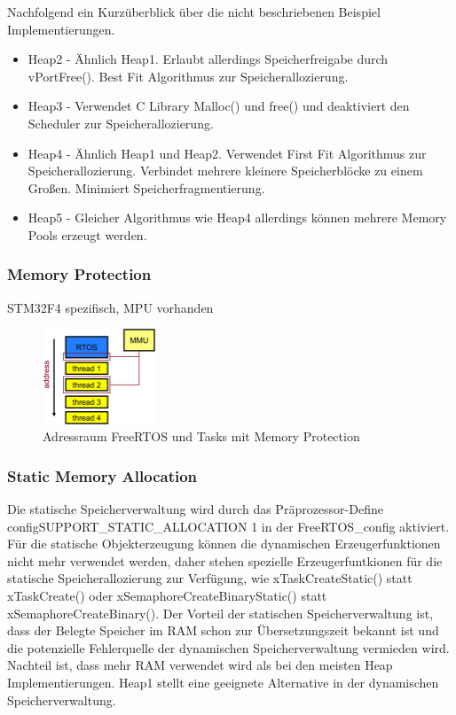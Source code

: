 Nachfolgend ein Kurzüberblick über die nicht beschriebenen Beispiel Implementierungen.  
\begin{itemize}
	\item Heap2 - Ähnlich Heap1. Erlaubt allerdings Speicherfreigabe durch vPortFree(). Best Fit Algorithmus zur Speicherallozierung. 
	\item Heap3 - Verwendet C Library Malloc() und free() und deaktiviert den Scheduler zur Speicherallozierung.
	\item Heap4 - Ähnlich Heap1 und Heap2. Verwendet First Fit Algorithmus zur Speicherallozierung. Verbindet mehrere kleinere Speicherblöcke zu einem Großen. Minimiert Speicherfragmentierung.
	\item Heap5 - Gleicher Algorithmus wie Heap4 allerdings können mehrere Memory Pools erzeugt werden.
\end{itemize}
\subsubsection{Memory Protection}
\label{sec:Memory Protection}
STM32F4 spezifisch, MPU vorhanden
\begin{figure}[hb!]
	\centering
		\includegraphics[width=0.3\textwidth]{Pictures/EmbeddedCom/addressSpaceMMU}
	\caption{Adressraum FreeRTOS und Tasks mit Memory Protection}
	\label{fig:AddressSpaceMMU}
\end{figure} 
\subsubsection{Static Memory Allocation}
Die statische Speicherverwaltung wird durch das Präprozessor-Define configSUPPORT\_STATIC\_ALLOCATION 1 in der FreeRTOS\_config aktiviert. Für die statische Objekterzeugung können die dynamischen Erzeugerfunktionen nicht mehr verwendet werden, daher stehen spezielle Erzeugerfuntkionen für die statische Speicherallozierung zur Verfügung, wie xTaskCreateStatic() statt xTaskCreate() oder xSemaphoreCreateBinaryStatic() statt xSemaphoreCreateBinary(). Der Vorteil der statischen Speicherverwaltung ist, dass der Belegte Speicher im RAM schon zur Übersetzungszeit bekannt ist und die potenzielle Fehlerquelle der dynamischen Speicherverwaltung vermieden wird. Nachteil ist, dass mehr RAM verwendet wird als bei den meisten Heap Implementierungen. Heap1 stellt eine geeignete Alternative in der dynamischen Speicherverwaltung.   

      